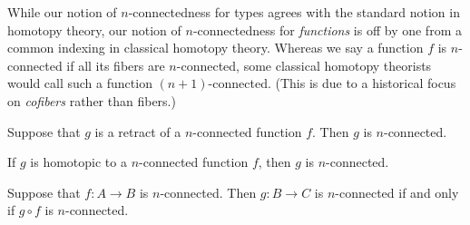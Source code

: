 \documentclass[hott-all.tex]{subfiles}
\begin{document}
% 
\begin{rmk}
  While our notion of $n$-connectedness for types agrees with the standard notion in homotopy theory, our notion of $n$-connectedness for \emph{functions} is off by one from a common indexing in classical homotopy theory.
  Whereas we say a function $f$ is $n$-connected if all its fibers are $n$-connected, some classical homotopy theorists would call such a function $(n+1)$-connected.
  (This is due to a historical focus on \emph{cofibers} rather than fibers.)
\end{rmk}
% 
% 
\begin{lem}
%
Suppose that $g$ is a retract of a $n$-connected function $f$.  Then $g$ is
$n$-connected.
\end{lem}
% 
\begin{cor}
If $g$ is homotopic to a $n$-connected function $f$, then $g$ is $n$-connected.
\end{cor}
% 
\begin{lem}
Suppose that $f:A\to B$ is $n$-connected. Then $g:B\to C$ is $n$-connected if and only if $g\circ f$ is
$n$-connected.
\end{lem}
% 
% 
\end{document}
